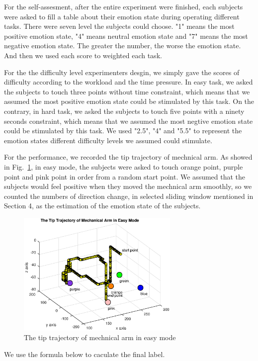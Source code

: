 \documentclass[runningheads,a4paper]{llncs}
\begin{document}
For the self-assesment, after the entire experiment were finished,
each subjects were asked to fill a table about their emotion state during
operating different tasks. There were seven level the subjects could choose.
"1" means the most positive emotion state, "4" means neutral emotion state and
"7" means the most negative emotion state. The greater the number, the worse the
emotion state. And then we used each score to weighted each task.

For the the difficulty level experimenters desgin, we simply gave the scores of
difficulty according to the workload and the time pressure. In easy task, we
asked the subjects to touch three points without time constraint, which means that
we assumed the most positive emotion state could be stimulated by this task.
On the contrary, in hard task, we asked the subjects to touch five points with a ninety seconds
constraint, which means that we assumed the most negtive emotion state could be stimulated by
this task. We used "2.5", "4" and "5.5" to represent the emotion states different difficulty levels
we assumed could stimulate.

For the performance, we recorded the tip trajectory of mechnical arm. As showed
in Fig.~\ref{fig:track}, in easy mode, the subjects were asked to touch orange
point, purple point and pink point in order from a random start point. We assumed
that the subjects would feel positive when they moved the mechnical arm smoothly,
so we counted the numbers of direction change, in selected sliding window
mentioned in Section 4, as the estimation of the emotion state of the subjects.

\begin{figure}
  \centering
  \includegraphics[height=6cm]{images/14}
  \caption{The tip trajectory of mechnical arm in easy mode}
  \label{fig:track}
\end{figure}

We use the formula below to caculate the final label.
\end{document}
